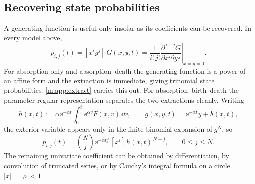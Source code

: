 \subsection{Recovering state probabilities}
\label{m:sec:coefrecovery}

A generating function is useful only insofar as its coefficients can be recovered.
In every model above,
\begin{equation}
\label{m:eq:bivariatecoef}
p_{i,j}(t) = [x^iy^j]\,G(x,y,t)
= \frac{1}{i!\,j!}\left.\frac{\partial^{\,i+j}G}{\partial x^i\partial y^{\,j}}
\right|_{x=y=0} .
\end{equation}
For absorption only and absorption--death the generating function is a power of an
affine form and the extraction is immediate, giving trinomial state probabilities;
\cref{m:app:extract} carries this out. For absorption--birth--death the
parameter-regular representation separates the two extractions cleanly. Writing
\begin{equation}
\label{m:eq:hdef}
h(x,t) := \alpha\ee^{-\alpha t}\int_0^t\ee^{\alpha v}F(x,v)\,\dd v,
\qquad
g(x,y,t) = \ee^{-\alpha t}y + h(x,t),
\end{equation}
the exterior variable appears only in the finite binomial expansion of $g^N$, so
\begin{equation}
\label{m:eq:abdcoef}
p_{i,j}(t) = \binom{N}{j}\ee^{-\alpha t j}\,[x^i]\,h(x,t)^{\,N-j},
\qquad 0\le j\le N .
\end{equation}
The remaining univariate coefficient can be obtained by differentiation, by
convolution of truncated series, or by Cauchy's integral formula on a circle
$|x|=\varrho<1$.

\FloatBarrier
